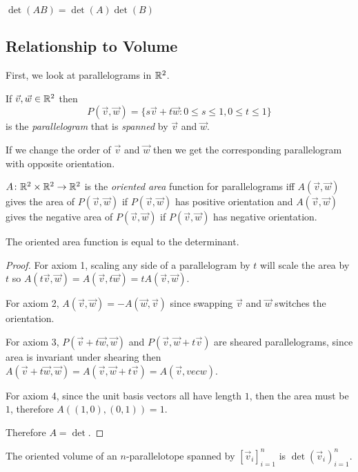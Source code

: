 \documentclass[notes]{subfiles}
\begin{document}
\begin{lemma}
    $\det(AB) = \det(A)\det(B)$
\end{lemma}

\subsection{Relationship to Volume}
First, we look at parallelograms in $\mathbb{R}^2$.

\begin{definition}[Parallelogram]
    If $\vec{v}, \vec{w} \in \mathbb{R}^2$ then
    \[
        P(\vec{v}, \vec{w}) = \{ s\vec{v} + t\vec{w} : 0 \leq s \leq 1, 0 \leq t \leq 1 \}
    \]
    is the \textit{parallelogram} that is \textit{spanned} by $\vec{v}$ and $\vec{w}$.
\end{definition}

If we change the order of $\vec{v}$ and $\vec{w}$ then we get the corresponding parallelogram with opposite orientation.

\begin{definition}
    $A\colon \mathbb{R}^2 \times \mathbb{R}^2 \to \mathbb{R}^2$ is the \textit{oriented area} function for parallelograms iff $A(\vec{v}, \vec{w})$ gives the area of $P(\vec{v}, \vec{w})$ if $P(\vec{v}, \vec{w})$ has positive orientation and $A(\vec{v}, \vec{w})$ gives the negative area of $P(\vec{v}, \vec{w})$ if $P(\vec{v}, \vec{w})$ has negative orientation.
\end{definition}

\begin{lemma}
    The oriented area function is equal to the determinant.
\end{lemma}
\begin{proof}
    For axiom 1, scaling any side of a parallelogram by $t$ will scale the area by $t$ so $A(t\vec{v}, \vec{w}) = A(\vec{v}, t\vec{w}) = tA(\vec{v}, \vec{w})$.

    For axiom 2, $A(\vec{v}, \vec{w}) = -A(\vec{w}, \vec{v})$ since swapping $\vec{v}$ and $\vec{w}$ switches the orientation.

    For axiom 3, $P(\vec{v} + t\vec{w}, \vec{w})$ and $P(\vec{v}, \vec{w} + t\vec{v})$ are sheared parallelograms, since area is invariant under shearing then $A(\vec{v} + t\vec{w}, \vec{w}) = A(\vec{v}, \vec{w} + t\vec{v}) = A(\vec{v},vec{w})$.

    For axiom 4, since the unit basis vectors all have length $1$, then the area must be $1$, therefore $A((1, 0), (0, 1)) = 1$.

    Therefore $A = \det$.
\end{proof}

\begin{theorem}
    The oriented volume of an $n$-parallelotope spanned by $[\vec{v}_i]_{i = 1}^n$ is $\det(\vec{v}_i)_{i = 1}^n$.
\end{theorem}
\end{document}
